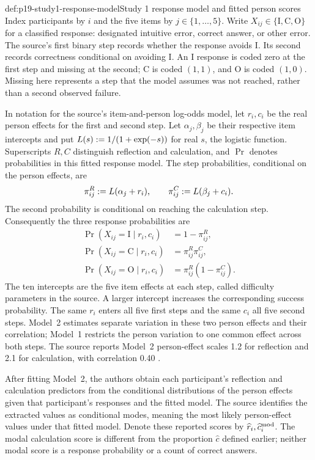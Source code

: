 \begin{hbdefinition}{def:p19-study1-response-model}{Study 1 response model and fitted person scores}
Index participants by \(i\) and the five items by \(j\in\{1,\ldots,5\}\).
Write \(X_{ij}\in\{\mathrm I,\mathrm C,\mathrm O\}\) for a classified
response: designated intuitive error, correct answer, or other error.
The source's first binary step records whether the response avoids
\(\mathrm I\). Its second records correctness conditional on avoiding
\(\mathrm I\). An \(\mathrm I\) response is coded zero at the first step
and missing at the second; \(\mathrm C\) is coded \((1,1)\), and
\(\mathrm O\) is coded \((1,0)\). Missing here represents a step that the
model assumes was not reached, rather than a second observed failure.

In notation for the source's item-and-person log-odds model, let \(r_i,c_i\)
be the real person effects for the first and second step. Let
\(\alpha_j,\beta_j\) be their respective item intercepts and put
\(L(s)\mathrel{:=}1/(1+\exp(-s))\) for real \(s\), the logistic function.
Superscripts \(R,C\) distinguish reflection and calculation, and \(\Pr\)
denotes probabilities in this fitted response model. The step probabilities,
conditional on the person effects, are
\[
 \pi^{R}_{ij}\mathrel{:=} L(\alpha_j+r_i),\qquad
 \pi^{C}_{ij}\mathrel{:=} L(\beta_j+c_i).
\]
The second probability is conditional on reaching the calculation step.
Consequently the three response probabilities are
\[
\begin{aligned}
 \Pr(X_{ij}=\mathrm I\mid r_i,c_i)&=1-\pi^{R}_{ij},\\
 \Pr(X_{ij}=\mathrm C\mid r_i,c_i)&=\pi^{R}_{ij}\pi^{C}_{ij},\\
 \Pr(X_{ij}=\mathrm O\mid r_i,c_i)&=\pi^{R}_{ij}(1-\pi^{C}_{ij}).
\end{aligned}
\]
The ten intercepts are the five item effects at each step, called difficulty
parameters in the source.
A larger intercept increases the corresponding success probability.
The same \(r_i\) enters all five first steps and the same \(c_i\) all five
second steps. Model~2 estimates separate variation in these two person effects
and their correlation; Model~1 restricts the person variation to one common
effect across both steps. The source reports Model~2 person-effect scales
1.2 for reflection and 2.1 for calculation, with correlation 0.40
\cite[pp.~5--7, tables~1 and 4]{SinayevPeters2015Calculation}.

After fitting Model~2, the authors obtain each participant's reflection and
calculation predictors from the conditional distributions of the person
effects given that participant's responses and the fitted model. The source
identifies the extracted values as conditional modes, meaning the most likely
person-effect values under that fitted model. Denote these reported scores
by \(\widehat r_i,\widehat c_i^{\rm mod}\). The modal calculation score
is different from the proportion \(\widehat c\) defined earlier; neither
modal score is a response probability or a count of correct answers.


\end{hbdefinition}
